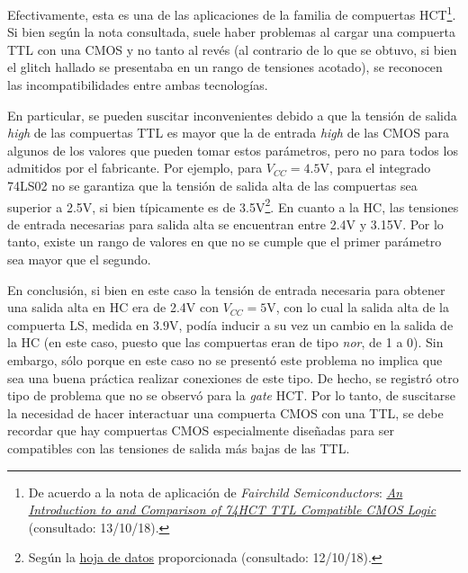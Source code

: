 \documentclass[../../e3_tp2_main.tex]{subfiles}
\begin{document}
Efectivamente, esta es una de las aplicaciones de la familia de compuertas HCT\footnote{De acuerdo a la nota de aplicaci\'on de \textit{Fairchild Semiconductors}: \href{https://www.fairchildsemi.com/application-notes/AN/AN-368.pdf}{\underline{\textit{An Introduction to and Comparison of 74HCT TTL Compatible CMOS Logic}}} (consultado: 13/10/18).}. Si bien seg\'un la nota consultada, suele haber problemas al cargar una compuerta TTL con una CMOS y no tanto al rev\'es (al contrario de lo que se obtuvo, si bien el glitch hallado se presentaba en un rango de tensiones acotado), se reconocen las incompatibilidades entre ambas tecnolog\'ias.\par

En particular, se pueden suscitar inconvenientes debido a que la tensi\'on de salida \textit{high} de las compuertas TTL es mayor que la de entrada \textit{high} de las CMOS para algunos de los valores que pueden tomar estos par\'ametros, pero no para todos los admitidos por el fabricante. Por ejemplo, para $V_{CC}=4.5\mathrm{V}$, para el integrado 74LS02 no se garantiza que la tensi\'on de salida alta de las compuertas sea superior a 2.5V, si bien t\'ipicamente es de 3.5V\footnote{Seg\'un la \href{http://www.learn-c.com/74ls02.pdf}{\underline{hoja de datos}} proporcionada (consultado: 12/10/18).}. En cuanto a la HC, las tensiones de entrada necesarias para salida alta se encuentran entre 2.4V y 3.15V. Por lo tanto, existe un rango de valores en que no se cumple que el primer par\'ametro sea mayor que el segundo.\par

En conclusi\'on, si bien en este caso la tensi\'on de entrada necesaria para obtener una salida alta en HC era de 2.4V con $V_{CC}=5\mathrm{V}$, con lo cual la salida alta de la compuerta LS, medida en $3.9\mathrm{V}$, pod\'ia inducir a su vez un cambio en la salida de la HC (en este caso, puesto que las compuertas eran de tipo \textit{nor}, de 1 a 0). Sin embargo, s\'olo porque en este caso no se present\'o este problema no implica que sea una buena pr\'actica realizar conexiones de este tipo. De hecho, se registr\'o otro tipo de problema que no se observ\'o para la \textit{gate} HCT. Por lo tanto, de suscitarse la necesidad de hacer interactuar una compuerta CMOS con una TTL, se debe recordar que hay compuertas CMOS especialmente dise\~nadas para ser compatibles con las tensiones de salida m\'as bajas de las TTL.
\end{document}
